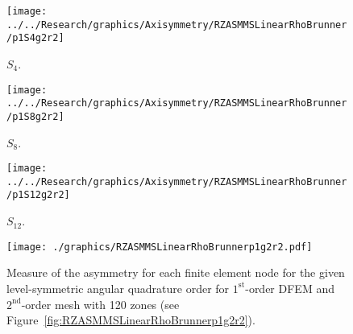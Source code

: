 \documentclass[12pt]{article}
\begin{document}
\begin{sidewaysfigure}[!htb]
\centering
\begin{subfigure}{0.33\textwidth}
\texttt{[image: ../../Research/graphics/Axisymmetry/RZASMMSLinearRhoBrunner/p1S4g2r2]}
\caption{$S_4$.}
\end{subfigure}%
\begin{subfigure}{0.33\textwidth}
\texttt{[image: ../../Research/graphics/Axisymmetry/RZASMMSLinearRhoBrunner/p1S8g2r2]}
\caption{$S_8$.}
\end{subfigure}%
\begin{subfigure}{0.33\textwidth}
\texttt{[image: ../../Research/graphics/Axisymmetry/RZASMMSLinearRhoBrunner/p1S12g2r2]}
\caption{$S_{12}$.}
\end{subfigure}
\caption{Relative asymmetry for $1^\text{st}$-order finite elements on a $2^\text{nd}$-order mesh for given order of level-symmetric angular quadrature.}
\label{fig:RZASMMSLinearRhoBrunnerp1g2r2}
\end{sidewaysfigure}

\begin{figure}[!htb]
\centering
\texttt{[image: ./graphics/RZASMMSLinearRhoBrunnerp1g2r2.pdf]}
\caption{Measure of the asymmetry for each finite element node for the given level-symmetric angular quadrature order for $1^\text{st}$-order DFEM and $2^\text{nd}$-order mesh with 120 zones (see Figure~\ref{fig:RZASMMSLinearRhoBrunnerp1g2r2}).}
\label{fig:RZASMMSLinearRhoBrunnerp1g2r2Nodes}
\end{figure}
\end{document}
